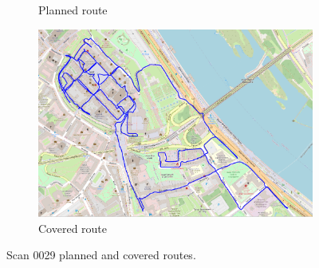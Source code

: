 \documentclass[a4paper,12pt]{book}
\begin{document}
\begin{enumerate}
\begin{figure}[H]
\begin{subfigure}{.95\textwidth}
			\caption{Planned route}
			\label{fig:a29}
		\end{subfigure}%
		\linebreak
		\begin{subfigure}{.95\textwidth}
			\centering
			\includegraphics[width=1\linewidth]{route_c29}
			\caption{Covered route}
			\label{fig:b29}
		\end{subfigure}
		\caption{Scan 0029 planned and covered routes.}
		\label{fig:fig29}
	\end{figure}
\end{enumerate}
\end{document}
